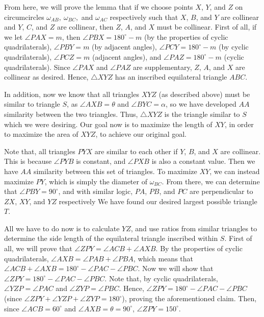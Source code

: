 \begin{enumerate}
 From here, we will prove the lemma that if we choose points $X$, $Y$, and $Z$ on circumcircles $\omega_{AB}, ~\omega_{BC},$ and $\omega_{AC}$ respectively such that $X$, $B$, and $Y$ are collinear and $Y$, $C$, and $Z$ are collinear, then $Z$, $A$, and $X$ must be collinear. First of all, if we let $\angle PAX = m$, then $\angle PBX = 180^{\circ} - m$ (by the properties of cyclic quadrilaterals), $\angle PBY = m$ (by adjacent angles), $\angle PCY = 180^{\circ} - m$ (by cyclic quadrilaterals), $\angle PCZ = m$ (adjacent angles), and $\angle PAZ = 180^{\circ} - m$ (cyclic quadrilaterals). Since $\angle PAX$ and $\angle PAZ$ are supplementary, $Z$, $A$, and $X$ are collinear as desired. Hence, $\triangle XYZ$ has an inscribed equilateral triangle $ABC$.

 In addition, now we know that all triangles $XYZ$ (as described above) must be similar to triangle $S$, as $\angle AXB = \theta$ and $\angle BYC = \alpha$, so we have developed $AA$ similarity between the two triangles. Thus, $\triangle XYZ$ is the triangle similar to $S$ which we were desiring. Our goal now is to maximize the length of $XY$, in order to maximize the area of $XYZ$, to achieve our original goal.

 Note that, all triangles $PYX$ are similar to each other if $Y$, $B$, and $X$ are collinear. This is because $\angle PYB$ is constant, and $\angle PXB$ is also a constant value. Then we have $AA$ similarity between this set of triangles. To maximize $XY$, we can instead maximize $PY$, which is simply the diameter of $\omega_{BC}$. From there, we can determine that $\angle PBY = 90^{\circ}$, and with similar logic, $PA$, $PB$, and $PC$ are perpendicular to $ZX$, $XY$, and $YZ$ respectively We have found our desired largest possible triangle $T$.

 All we have to do now is to calculate $YZ$, and use ratios from similar triangles to determine the side length of the equilateral triangle inscribed within $S$. First of all, we will prove that $\angle ZPY = \angle ACB + \angle AXB$. By the properties of cyclic quadrilaterals, $\angle AXB = \angle PAB + \angle PBA$, which means that $\angle ACB + \angle AXB = 180^{\circ} - \angle PAC - \angle PBC$. Now we will show that $\angle ZPY =  180^{\circ} - \angle PAC - \angle PBC$. Note that, by cyclic quadrilaterals, $\angle YZP = \angle PAC$ and $\angle ZYP = \angle PBC$. Hence, $\angle ZPY = 180^{\circ} - \angle PAC - \angle PBC$ (since $\angle ZPY + \angle YZP + \angle ZYP = 180^{\circ}$), proving the aforementioned claim. Then, since $\angle ACB = 60^{\circ}$ and $\angle AXB = \theta = 90^{\circ}$, $\angle ZPY = 150^{\circ}$.


\end{enumerate}
